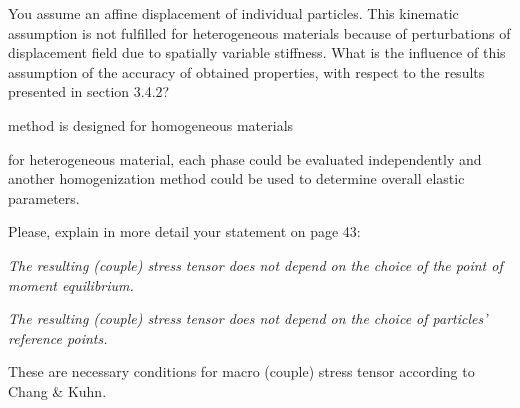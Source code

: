 \documentclass[%
]{phdpresentation}
\begin{document}
\begin{discussion}
\begin{questionframe}{2}
	\begin{questionblock}
		You assume an affine displacement of individual particles.
		This kinematic assumption is not fulfilled for heterogeneous materials because of perturbations of displacement field due to spatially variable stiffness.
		What is the influence of this assumption of the accuracy of obtained properties, with respect to the results presented in section 3.4.2?
	\end{questionblock}
	\begin{answerblock}
		\begin{myitemize}
			\item method is designed for homogeneous materials
			\item for heterogeneous material, each phase could be evaluated independently and another homogenization method could be used to determine overall elastic parameters.
		\end{myitemize}
	\end{answerblock}
\end{questionframe}

\begin{questionframe}{3}
	\begin{questionblock}
		Please, explain in more detail your statement on page 43:\par
		\textit{The resulting (couple) stress tensor does not depend on the choice of the point of moment equilibrium.}\par
		\textit{The resulting (couple) stress tensor does not depend on the choice of particles' reference points.}\par
	\end{questionblock}
	\begin{answerblock}
		These are necessary conditions for macro (couple) stress tensor according to Chang \& Kuhn.
	\end{answerblock}
\end{questionframe}


\end{discussion}
\end{document}
